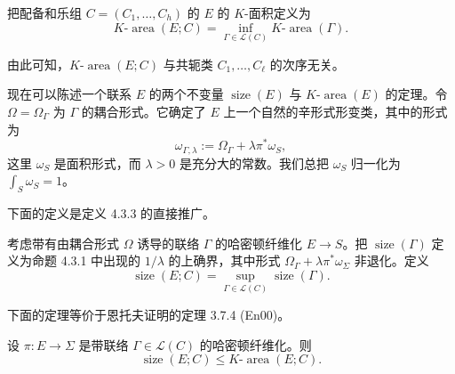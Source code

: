 \begin{definition}\label{def:k-area-holonomy-tuple}
把配备和乐组 $C=(C_1,\ldots,C_h)$ 的 $E$ 的 $K$-面积定义为
\begin{equation}
 K\text{-}\operatorname{area}(E;C)
 =\inf_{\Gamma\in\mathcal L(C)}K\text{-}\operatorname{area}(\Gamma).
 \label{eq:k-area-holonomy-tuple}
\end{equation}
\end{definition}

由此可知，$K\text{-}\operatorname{area}(E;C)$ 与共轭类
$C_1,\ldots,C_\ell$ 的次序无关。

现在可以陈述一个联系 $E$ 的两个不变量 $\operatorname{size}(E)$ 与
$K\text{-}\operatorname{area}(E)$ 的定理。令 $\Omega=\Omega_\Gamma$ 为
$\Gamma$ 的耦合形式。它确定了 $E$ 上一个自然的辛形式形变类，其中的形式为
\[
 \omega_{\Gamma,\lambda}:=\Omega_\Gamma+\lambda\pi^*\omega_S,
\]
这里 $\omega_S$ 是面积形式，而 $\lambda>0$ 是充分大的常数。我们总把
$\omega_S$ 归一化为 $\int_S\omega_S=1$。

下面的定义是定义 4.3.3 的直接推广。

\begin{definition}\label{def:size-with-holonomy}
考虑带有由耦合形式 $\Omega$ 诱导的联络 $\Gamma$ 的哈密顿纤维化
$E\to S$。把 $\operatorname{size}(\Gamma)$ 定义为命题 4.3.1 中出现的
$1/\lambda$ 的上确界，其中形式
$\Omega_\Gamma+\lambda\pi^*\omega_\Sigma$ 非退化。定义
\begin{equation}
 \operatorname{size}(E;C)
 =\sup_{\Gamma\in\mathcal L(C)}\operatorname{size}(\Gamma).
 \label{eq:size-with-holonomy}
\end{equation}
\end{definition}

下面的定理等价于恩托夫证明的定理 3.7.4 (En00)。

\begin{theorem}\label{thm:size-k-area}
设 $\pi:E\to\Sigma$ 是带联络 $\Gamma\in\mathcal L(C)$ 的哈密顿纤维化。则
\begin{equation}
 \operatorname{size}(E;C)
 \leq K\text{-}\operatorname{area}(E;C).
 \label{eq:size-k-area}
\end{equation}
\end{theorem}

